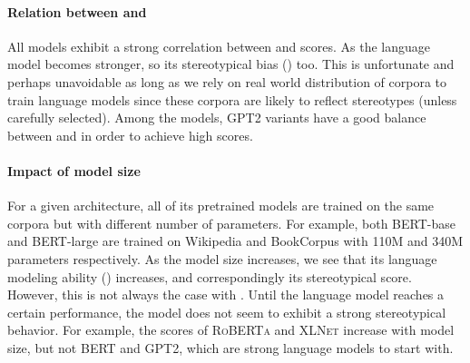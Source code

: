 \documentclass[11pt,a4paper]{article}
\newcommand \bert{\textsc{BERT}\xspace}
\newcommand \roberta{\textsc{RoBERTa}\xspace}
\newcommand \xlnet{\textsc{XLNet}\xspace}
\newcommand \gpt{\textsc{GPT2}\xspace}
\begin{document}
\paragraph{Relation between  and }
All models exhibit a strong correlation between  and  scores.
As the language model becomes stronger, so its stereotypical bias () too.
This is unfortunate and perhaps unavoidable as long as we rely on real world distribution of corpora to train language models since these corpora are likely to reflect stereotypes (unless carefully selected).
Among the models, \gpt variants have a good balance between  and  in order to achieve high  scores.


\paragraph{Impact of model size}
For a given architecture, all of its pretrained models are trained on the same corpora but with different number of parameters.
For example, both \bert-base and \bert-large are trained on Wikipedia and BookCorpus \cite{zhu2015aligning} with 110M and 340M parameters respectively.
As the model size increases, we see that its language modeling ability () increases, and correspondingly its stereotypical score.
However, this is not always the case with .
Until the language model reaches a certain performance, the model does not seem to exhibit a strong stereotypical behavior.
For example, the  scores of \roberta and \xlnet increase with model size, but not \bert and \gpt, which are strong language models to start with.
\end{document}
